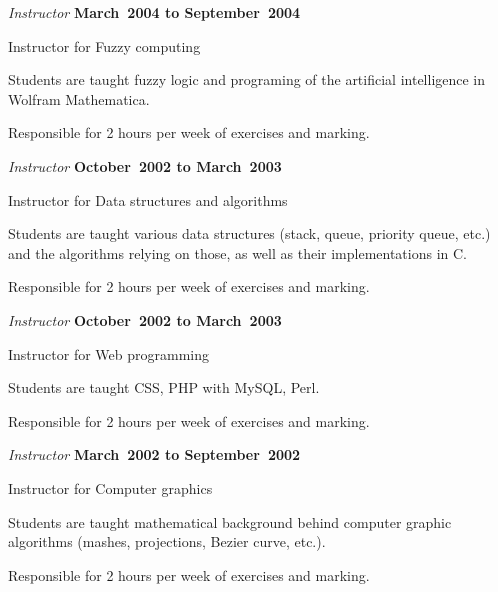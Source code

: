 \documentclass[10pt]{article}
\begin{document}
\begin{outerlist}
\item[] \textit{Instructor} \hfill \textbf{March~2004 to September~2004}
  \begin{innerlist}
    \item Instructor for Fuzzy computing
      \begin{innerlist}
        \item Students are taught fuzzy logic and programing of the artificial intelligence in Wolfram Mathematica.
        \item Responsible for 2 hours per week of exercises and marking.
      \end{innerlist}
  \end{innerlist}

\item[] \textit{Instructor} \hfill \textbf{October~2002 to March~2003}
  \begin{innerlist}
    \item Instructor for Data structures and algorithms
      \begin{innerlist}
        \item Students are taught various data structures (stack, queue, priority queue, etc.) and the algorithms relying on those, as well as their implementations in C.
        \item Responsible for 2 hours per week of exercises and marking.
      \end{innerlist}
  \end{innerlist}

\item[] \textit{Instructor} \hfill \textbf{October~2002 to March~2003}
  \begin{innerlist}
    \item Instructor for Web programming
      \begin{innerlist}
        \item Students are taught CSS, PHP with MySQL, Perl.
        \item Responsible for 2 hours per week of exercises and marking.
      \end{innerlist}
  \end{innerlist}

\item[] \textit{Instructor} \hfill \textbf{March~2002 to September~2002}
  \begin{innerlist}
    \item Instructor for Computer graphics
      \begin{innerlist}
        \item Students are taught mathematical background behind computer graphic algorithms (mashes, projections, Bezier curve, etc.).
        \item Responsible for 2 hours per week of exercises and marking.
      \end{innerlist}
  \end{innerlist}


\end{outerlist}
\end{document}
